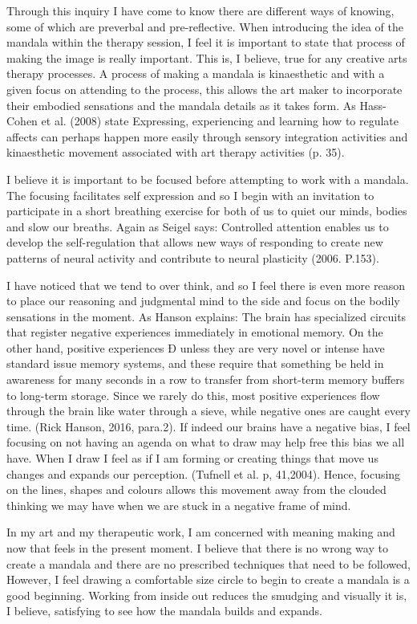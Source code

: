 Through this inquiry I have come to know there are different ways of knowing, some of which are preverbal and pre-reflective. When introducing the idea of the mandala within the therapy session, I feel it is important to state that process of making the image is really important. This is, I believe, true for any creative arts therapy processes. A process of making a mandala is kinaesthetic and with a given focus on attending to the process, this allows the art maker to incorporate their embodied sensations and the mandala details as it takes form. As Hass-Cohen et al. (2008) state Expressing, experiencing and learning how to regulate affects can perhaps happen more easily through sensory integration activities and kinaesthetic movement associated with art therapy activities (p. 35).

I believe it is important to be focused before attempting to work with a mandala. The focusing facilitates self expression and so I begin with an invitation to participate in a short breathing exercise for both of us to quiet our minds, bodies and slow our breaths. Again as Seigel says: Controlled attention enables us to develop the self-regulation that allows new ways of responding to create new patterns of neural activity and contribute to neural plasticity (2006. P.153).

I have noticed that we tend to over think, and so I feel there is even more reason to place our reasoning and judgmental mind to the side and focus on the bodily sensations in the moment. As Hanson explains:
The brain has specialized circuits that register negative experiences immediately in emotional memory. On the other hand, positive experiences Ð unless they are very novel or intense  have standard issue memory systems, and these require that something be held in awareness for many seconds in a row to transfer from short-term memory buffers to long-term storage. Since we rarely do this, most positive experiences flow through the brain like water through a sieve, while negative ones are caught every time. (Rick Hanson, 2016, para.2).
If indeed our brains have a negative bias, I feel focusing on not having an agenda on what to draw may help free this bias we all have. When I draw I feel as if I am forming or creating things that move us changes and expands our perception. (Tufnell et al. p, 41,2004). Hence, focusing on the lines, shapes and colours allows this movement away from the clouded thinking we may have when we are stuck in a negative frame of mind. 

In my art and my therapeutic work, I am concerned with meaning making and now that feels in the present moment. I believe that there is no wrong way to create a mandala and there are no prescribed techniques that need to be followed, However, I feel drawing a comfortable size circle to begin to create a mandala is a good beginning. Working from inside out reduces the smudging and visually it is, I believe, satisfying to see how the mandala builds and expands.

